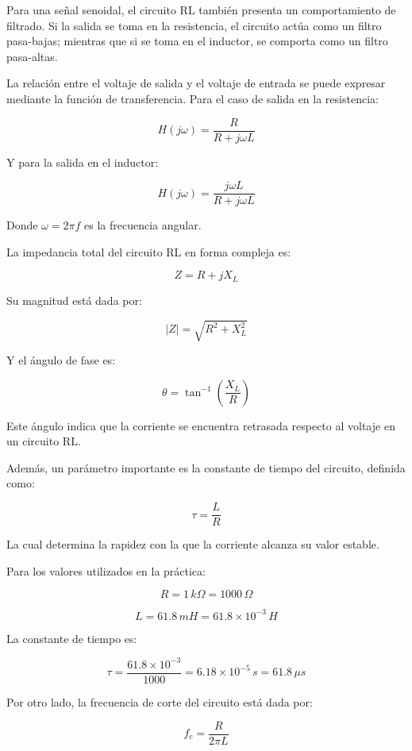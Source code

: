 \documentclass[letter,11pt]{article}
\begin{document}
			\hspace{0.5cm}Para una señal senoidal, el circuito RL también presenta un comportamiento de filtrado. Si la salida se toma en la resistencia, el circuito actúa como un filtro pasa-bajas; mientras que si se toma en el inductor, se comporta como un filtro pasa-altas.
			
			\hspace{0.5cm}La relación entre el voltaje de salida y el voltaje de entrada se puede expresar mediante la función de transferencia. Para el caso de salida en la resistencia:
			
			\[
			H(j\omega) = \frac{R}{R + j\omega L}
			\]
			
			Y para la salida en el inductor:
			
			\[
			H(j\omega) = \frac{j\omega L}{R + j\omega L}
			\]
			
			Donde $\omega = 2\pi f$ es la frecuencia angular.
			
			La impedancia total del circuito RL en forma compleja es:
			
			\[
			Z = R + jX_L
			\]
			
			Su magnitud está dada por:
			
			\[
			|Z| = \sqrt{R^2 + X_L^2}
			\]
			
			Y el ángulo de fase es:
			
			\[
			\theta = \tan^{-1}\left(\frac{X_L}{R}\right)
			\]
			
			Este ángulo indica que la corriente se encuentra retrasada respecto al voltaje en un circuito RL.
			
			Además, un parámetro importante es la constante de tiempo del circuito, definida como:
			
			\[
			\tau = \frac{L}{R}
			\]
			
			La cual determina la rapidez con la que la corriente alcanza su valor estable.
			
			Para los valores utilizados en la práctica:
			
			\[
			R = 1\,k\Omega = 1000\,\Omega
			\]
			
			\[
			L = 61.8\,mH = 61.8 \times 10^{-3}\,H
			\]
			
			La constante de tiempo es:
			
			\[
			\tau = \frac{61.8 \times 10^{-3}}{1000} = 6.18 \times 10^{-5}\,s = 61.8\,\mu s
			\]
			
			Por otro lado, la frecuencia de corte del circuito está dada por:
			
			\[
			f_c = \frac{R}{2\pi L}
			\]
			
\end{document}
